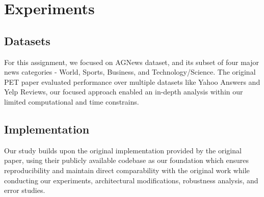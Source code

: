 \documentclass[11pt,a4paper]{article}
\begin{document}
\section{Experiments}

\subsection{Datasets}
For this assignment, we focused on AGNews dataset, and its subset of four major news categories - World, Sports, Business, and Technology/Science. The original PET paper evaluated performance over multiple datasets like Yahoo Answers and Yelp Reviews, our focused approach enabled an in-depth analysis within our limited computational and time constrains.

\subsection{Implementation} 
Our study \cite{pet_reproduction2024} builds upon the original implementation provided by the original paper, using their publicly available codebase as our foundation which ensures reproducibility and maintain direct comparability with the original work while conducting our experiments, architectural modifications, robustness analysis, and error studies.
\end{document}
